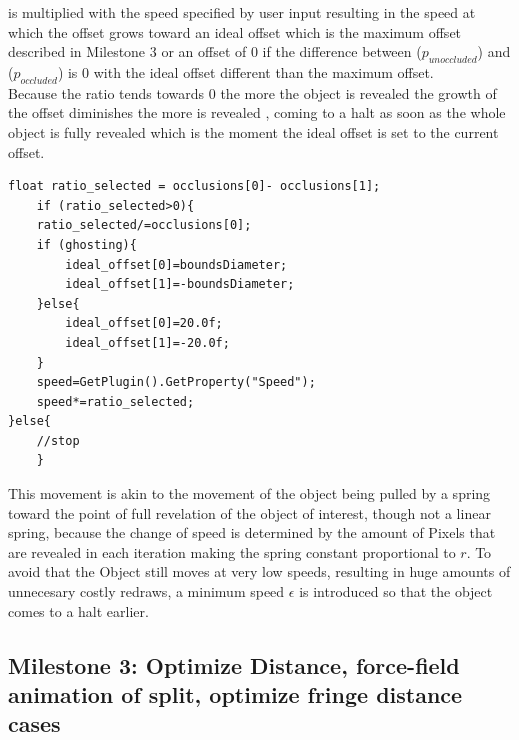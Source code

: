 is multiplied with the speed specified by user input resulting in the speed at which the offset grows toward an ideal offset which is the maximum offset described in Milestone 3 or an offset of 0 if the difference between  ($p_{unoccluded}$) and  ($p_{occluded}$) is 0 with the ideal offset different than the maximum offset.\\
Because the ratio tends towards 0 the more the object is revealed the growth of the offset diminishes the more is revealed , coming to a halt as soon as the whole object is fully revealed which is the moment the ideal offset is set to the current offset.\\
\begin{verbatim}
float ratio_selected = occlusions[0]- occlusions[1];
	if (ratio_selected>0){
	ratio_selected/=occlusions[0];
	if (ghosting){
		ideal_offset[0]=boundsDiameter;
		ideal_offset[1]=-boundsDiameter;
	}else{
		ideal_offset[0]=20.0f;
		ideal_offset[1]=-20.0f;
	}
	speed=GetPlugin().GetProperty("Speed");
	speed*=ratio_selected;
}else{
	//stop
	}
\end{verbatim}
This movement is akin to the movement of the object being pulled by a spring toward the point of full revelation of the object of interest, though not a linear spring, because the change of speed is determined by the amount of Pixels that are revealed in each iteration making the spring constant proportional to $r$.
To avoid that the Object still moves at very low speeds, resulting in huge amounts of unnecesary costly redraws, a minimum speed $\epsilon$ is introduced so that the object comes to a halt earlier.\\
\subsection{Milestone 3: Optimize Distance, force-field animation of split, optimize fringe distance cases} 

